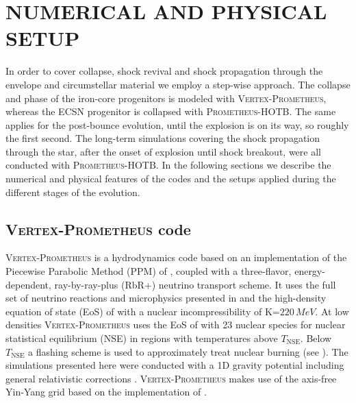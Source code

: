 \documentclass[fleqn,usenatbib]{mnras}
\newcommand{\prom}{\textsc{Prometheus-HOTB}\xspace}
\newcommand{\vertexprom}{\textsc{Vertex-Prometheus}\xspace}
\newcommand{\GEO}[1]{{\color{red}#1}}
\begin{document}
\section{NUMERICAL AND PHYSICAL SETUP}
\label{sec:Numerical and physical Setup}
In order to cover collapse, shock revival and shock propagation through the envelope and circumstellar material we employ a step-wise approach.
The collapse and phase of the iron-core progenitors is modeled with \vertexprom, whereas the ECSN progenitor is collapsed with \prom.
The same applies for the post-bounce evolution, until the explosion is on its way, so roughly the first second. 
The long-term simulations covering the shock propagation through the star, after the onset of explosion until shock breakout, were all conducted with \prom.
In the following sections we describe the numerical and physical features of the codes and the setups applied during the different stages of the evolution.

\subsection{\vertexprom code}
\vertexprom is a hydrodynamics code based on an implementation of the Piecewise Parabolic Method (PPM) of \cite{Colella1984}, coupled with a three-flavor, energy-dependent, ray-by-ray-plus (RbR+) 
neutrino transport scheme. It uses the full set of neutrino reactions and microphysics presented in \cite{Buras2006} and the high-density equation of state (EoS) of \cite{Lattimer1991} with a nuclear incompressibility of $\mathrm{K}\mathord{=} 220\,\mathord{MeV}$.
\GEO{At low densities \vertexprom uses the EoS of \cite{Janka1999} with 23 nuclear species for nuclear statistical equilibrium (NSE) in regions with temperatures above $T_{\mathrm{NSE}}$. Below $T_{\mathrm{NSE}}$ a flashing scheme is used to approximately treat nuclear burning (see \citealt{Rampp2002}). }
The simulations presented here were conducted with a 1D gravity potential including general relativistic corrections \citep{Marek2006}. \vertexprom makes use of the axis-free Yin-Yang grid \citep{Kageyama2004} based on the implementation of \cite{Melson2016}.
\end{document}
